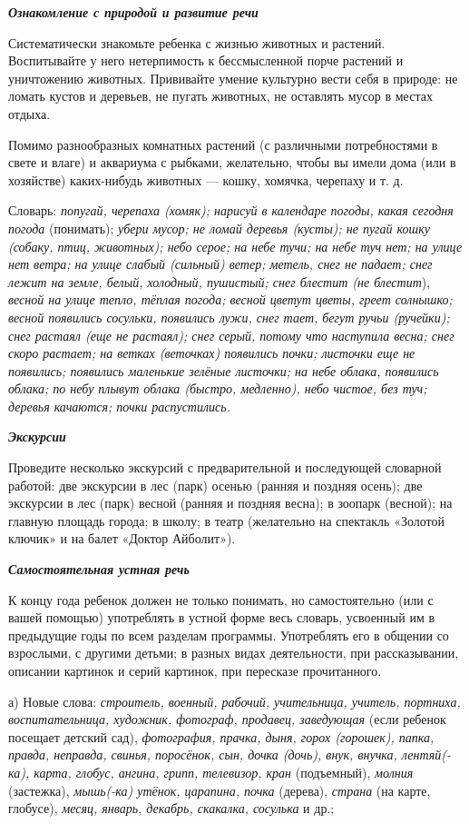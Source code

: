 \documentclass{book}
\renewcommand{\emph}[1]{\textit{#1}}
\begin{document}
\emph{\textbf{Ознакомление с природой и развитие речи}}

Систематически знакомьте ребенка с жизнью животных и растений.
Воспитывайте у него нетерпимость к бессмысленной порче растений и
уничтожению животных. Прививайте умение культурно вести себя в природе:
не ломать кустов и деревьев, не пугать животных, не оставлять мусор в
местах отдыха.

Помимо разнообразных комнатных растений (с различными потребностями в
свете и влаге) и аквариума с рыбками, желательно, чтобы вы имели дома
(или в хозяйстве) каких-нибудь животных --- кошку, хомячка, черепаху и
т. д.

Словарь: \emph{попугай, черепаха (хомяк); нарисуй в календаре погоды,
какая сегодня погода} (понимать); \emph{убери мусор; не ломай деревья
(кусты); не пугай кошку (собаку, птиц, животных); небо серое; на небе
тучи; на небе туч нет; на улице нет ветра; на улице слабый (сильный)
ветер; метель, снег не падает; снег лежит на земле, белый, холодный,
пушистый; снег блестит (не блестит}), \emph{весной на улице тепло,
тёплая погода; весной цветут цветы, греет солнышко; весной появились
сосульки, появились лужи, снег тает, бегут ручьи (ручейки); снег растаял
(еще не растаял); снег серый, потому что наступила весна; снег скоро
растает; на ветках (веточках) появились почки; листочки еще не
появились; появились маленькие зелёные листочки; на небе облака,
появились облака; по небу плывут облака (быстро, медленно), небо чистое,
без туч; деревья качаются; почки распустились.}

\emph{\textbf{Экскурсии}}

Проведите несколько экскурсий с предварительной и последующей словарной
работой: две экскурсии в лес (парк) осенью (ранняя и поздняя осень); две
экскурсии в лес (парк) весной (ранняя и поздняя весна); в зоопарк
(весной); на главную площадь города; в школу; в театр (желательно на
спектакль «Золотой ключик» и на балет «Доктор Айболит»).

\emph{\textbf{Самостоятельная устная речь}}

К концу года ребенок должен не только понимать, но самостоятельно (или с
вашей помощью) употреблять в устной форме весь словарь, усвоенный им в
предыдущие годы по всем разделам программы. Употреблять его в общении со
взрослыми, с другими детьми; в разных видах деятельности, при
рассказывании, описании картинок и серий картинок, при пересказе
прочитанного.

а) Новые слова: \emph{строитель, военный, рабочий, учительница, учитель,
портниха, воспитательница, художник, фотограф, продавец, заведующая}
(если ребенок посещает детский сад), \emph{фотография, прачка, дыня,
горох (горошек), папка, правда, неправда, свинья, поросёнок, сын, дочка
(дочь), внук, внучка, лентяй(-ка), карта, глобус, ангина, грипп,
телевизор, кран} (подъемный), \emph{молния} (застежка), \emph{мышь(-ка)
утёнок, царапина, почка} (дерева), \emph{страна} (на карте, глобусе),
\emph{месяц, январь, декабрь, скакалка, сосулька} и др.;
\end{document}
